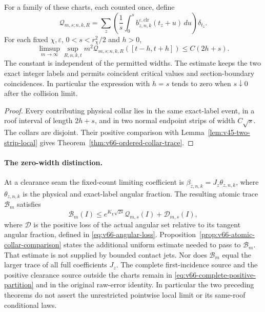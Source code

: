 \begin{leadtheorem}
\label{thm:intro-v66-trace}
For a family of these charts, each counted once, define
\[
 \mathcal Q_{m,s;n,k,R}
 =\sum_z\left(\frac1s\int_0^s
           b_{z,n,k}^{\varepsilon,\mathrm{clr}}(t_z+u)\,du\right)\delta_{t_z}.
\]
For each fixed $\chi,\varepsilon$, $0<s<r_\chi^2/2$ and $h>0$,
\[
 \limsup_{m\to\infty}\sup_{R,n,k,t}m^2
          \mathcal Q_{m,s;n,k,R}([t-h,t+h])\le C(2h+s).
\]
The constant is independent of the permitted widths. The estimate
keeps the two exact integer labels and permits coincident critical
values and section-boundary coincidences. In particular the expression
with $h=s$ tends to zero when $s\downarrow0$ after the collision limit.
\end{leadtheorem}
\begin{proof}
Every contributing physical collar lies in the same exact-label event,
in a roof interval of length $2h+s$, and in two normal endpoint strips
of width $C\sqrt s$. The collars are disjoint. Their positive comparison
with Lemma~\ref{lem:v45-two-strip-local} gives
Theorem~\ref{thm:v66-ordered-collar-trace}.
\end{proof}

\paragraph{The zero-width distinction.}
At a clearance seam the fixed-count limiting coefficient is
$\beta_{z,n,k}=J_z\theta_{z,n,k}$, where $\theta_{z,n,k}$ is the
physical and exact-label angular fraction. The resulting atomic trace
$\mathcal B_m$ satisfies
\[
 \mathcal B_m(I)\le e^{K_\chi\sqrt{2s}}\mathcal Q_{m,s}(I)
                            +\mathcal D_{m,s}(I),
\]
where $\mathcal D$ is the positive loss of the actual angular set
relative to its tangent angular fraction, defined in
\eqref{eq:v66-angular-loss}. Proposition~\ref{prop:v66-atomic-collar-comparison}
states the additional uniform estimate needed to pass to $\mathcal B_m$.
That estimate is not supplied by bounded contact jets. Nor does
$\mathcal B_m$ equal the larger trace of all full coefficients $J_z$.
The complete first-incidence source and the positive clearance source
outside the charts remain in
\eqref{eq:v66-complete-positive-partition} and in the original raw-error
identity. In particular the two preceding theorems do not assert the
unrestricted pointwise local limit or its same-roof conditional laws.

